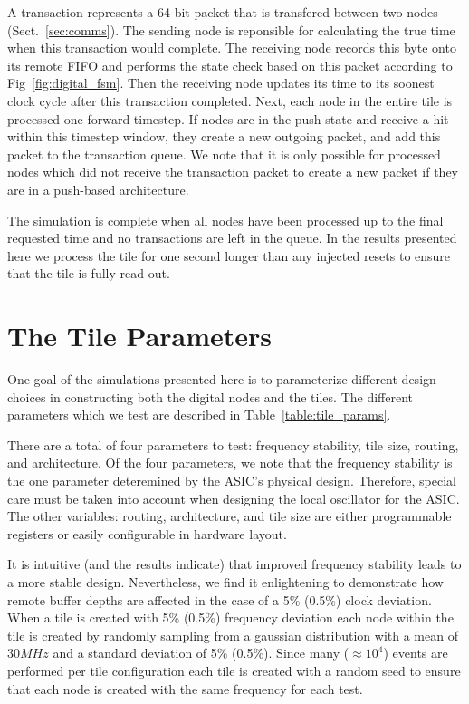 A transaction represents a 64-bit packet that is transfered between two nodes (Sect.~\ref{sec:comms}).
The sending node is reponsible for calculating the true time when this transaction would complete.
The receiving node records this byte onto its remote FIFO and performs the state check based on this packet according to Fig~\ref{fig:digital_fsm}.
Then the receiving node updates its time to its soonest clock cycle after this transaction completed.
Next, each node in the entire tile is processed one forward timestep.
If nodes are in the push state and receive a hit within this timestep window, they create a new outgoing packet, and add this packet to the transaction queue.
We note that it is only possible for processed nodes which did not receive the transaction packet to create a new packet if they are in a push-based architecture. 

The simulation is complete when all nodes have been processed up to the final requested time and no transactions are left in the queue. 
In the results presented here we process the tile for one second longer than any injected resets to ensure that the tile is fully read out.


\section{The Tile Parameters}

One goal of the simulations presented here is to parameterize different design choices in constructing both the digital nodes and the tiles.
The different parameters which we test are described in Table~\ref{table:tile_params}.

There are a total of four parameters to test: frequency stability, tile size, routing, and architecture.
Of the four parameters, we note that the frequency stability is the one parameter deteremined by the ASIC's physical design.
Therefore, special care must be taken into account when designing the local oscillator for the ASIC.
The other variables: routing, architecture, and tile size are either programmable registers or easily configurable in hardware layout.

It is intuitive (and the results indicate) that improved frequency stability leads to a more stable design.
Nevertheless, we find it enlightening to demonstrate how remote buffer depths are affected in the case of a 5\% (0.5\%) clock deviation.
When a tile is created with 5\% (0.5\%) frequency deviation each node within the tile is created by randomly sampling from a gaussian distribution with a mean of 30$\unit{MHz}$ and a standard deviation of 5\% (0.5\%).
Since many ($\approx 10^4$) events are performed per tile configuration each tile is created with a random seed to ensure that each node is created with the same frequency for each test.

